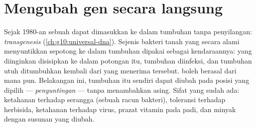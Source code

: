 \section{Mengubah gen secara langsung}

\begin{proposition}\label{prop:g12:domesticated-plants:transgenic}
Sejak 1980-an sebuah  dapat dimasukkan ke dalam tumbuhan tanpa
penyilangan: \emph{transgenesis} (\cref{ch:g10:universal-dna}).
Sejenis bakteri tanah yang secara alami menyuntikkan sepotong 
ke dalam  tumbuhan dipakai sebagai kendaraannya:  yang
diinginkan disisipkan ke dalam potongan itu,  tumbuhan diinfeksi,
dan tumbuhan utuh ditumbuhkan kembali dari  yang menerima 
tersebut.  boleh berasal dari  mana pun. Belakangan ini,
 tumbuhan itu sendiri dapat diubah pada posisi yang dipilih ---
\emph{penyuntingan } --- tanpa menambahkan  asing. Sifat yang
sudah ada: ketahanan terhadap serangga (sebuah  racun bakteri),
toleransi terhadap herbisida, ketahanan terhadap virus, prazat vitamin
pada padi, dan minyak dengan susunan yang diubah.
\end{proposition}
\admitted

